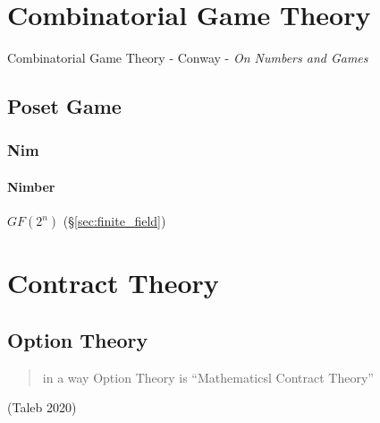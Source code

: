 


\section{Combinatorial Game Theory}\label{sec:combinatorial_game_theory}

Combinatorial Game Theory - Conway  - \emph{On Numbers and Games}



\subsection{Poset Game}\label{sec:poset_game}

\subsubsection{Nim}\label{sec:nim}

\paragraph{Nimber}\label{sec:nimber}\hfill

$GF(2^n)$ (\S\ref{sec:finite_field})



\section{Contract Theory}\label{sec:contract_theory}

\subsection{Option Theory}\label{sec:option_theory}

\begin{quote}
  in a way Option Theory is ``Mathematicsl Contract Theory''
\end{quote}
(Taleb 2020)



